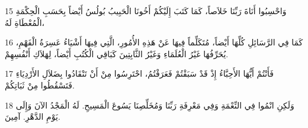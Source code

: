 \par 15 وَاحْسِبُوا أَنَاةَ رَبِّنَا خَلاَصاً، كَمَا كَتَبَ إِلَيْكُمْ أَخُونَا الْحَبِيبُ بُولُسُ أَيْضاً بِحَسَبِ الْحِكْمَةِ الْمُعْطَاةِ لَهُ،
\par 16 كَمَا فِي الرَّسَائِلِ كُلِّهَا أَيْضاً، مُتَكَلِّماً فِيهَا عَنْ هَذِهِ الأُمُورِ، الَّتِي فِيهَا أَشْيَاءُ عَسِرَةُ الْفَهْمِ، يُحَرِّفُهَا غَيْرُ الْعُلَمَاءِ وَغَيْرُ الثَّابِتِينَ كَبَاقِي الْكُتُبِ أَيْضاً، لِهَلاَكِ أَنْفُسِهِمْ.
\par 17 فَأَنْتُمْ أَيُّهَا الأَحِبَّاءُ إِذْ قَدْ سَبَقْتُمْ فَعَرَفْتُمُ، احْتَرِسُوا مِنْ أَنْ تَنْقَادُوا بِضَلاَلِ الأَرْدِيَاءِ فَتَسْقُطُوا مِنْ ثَبَاتِكُمْ.
\par 18 وَلَكِنِ انْمُوا فِي النِّعْمَةِ وَفِي مَعْرِفَةِ رَبِّنَا وَمُخَلِّصِنَا يَسُوعَ الْمَسِيحِ. لَهُ الْمَجْدُ الآنَ وَإِلَى يَوْمِ الدَّهْرِ. آمِينَ.

